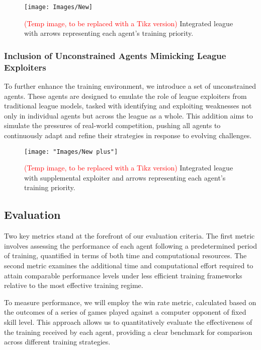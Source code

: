 \documentclass[journal]{IEEEtran}
\begin{document}
\begin{figure}
	\centering
	\texttt{[image: Images/New]}
	\caption{\textcolor{red}{(Temp image, to be replaced with a Tikz version)} Integrated league with arrows representing each agent's training priority.}
	\label{fig:new}
\end{figure}

	\subsubsection{Inclusion of Unconstrained Agents Mimicking League Exploiters} 
	To further enhance the training environment, we introduce a set of unconstrained agents. 
	These agents are designed to emulate the role of league exploiters from traditional league models, 
	tasked with identifying and exploiting weaknesses not only in individual agents but across the league as a whole. 
	This addition aims to simulate the pressures of real-world competition, 
	pushing all agents to continuously adapt and refine their strategies in response to evolving challenges.
	
\begin{figure}
	\centering
	\texttt{[image: "Images/New plus"]}
	\caption{\textcolor{red}{(Temp image, to be replaced with a Tikz version)} Integrated league with supplemental exploiter and arrows representing each agent's training priority.}
	\label{fig:new-plus}
\end{figure}
	
	\subsection{Evaluation}
	
	Two key metrics stand at the forefront of our evaluation criteria. The first metric involves assessing the performance of each agent following a predetermined period of training, quantified in terms of both time and computational resources. The second metric examines the additional time and computational effort required to attain comparable performance levels under less efficient training frameworks relative to the most effective training regime.
	
	To measure performance, we will employ the win rate metric, calculated based on the outcomes of a series of games played against a computer opponent of fixed skill level. This approach allows us to quantitatively evaluate the effectiveness of the training received by each agent, providing a clear benchmark for comparison across different training strategies.
	
\end{document}
